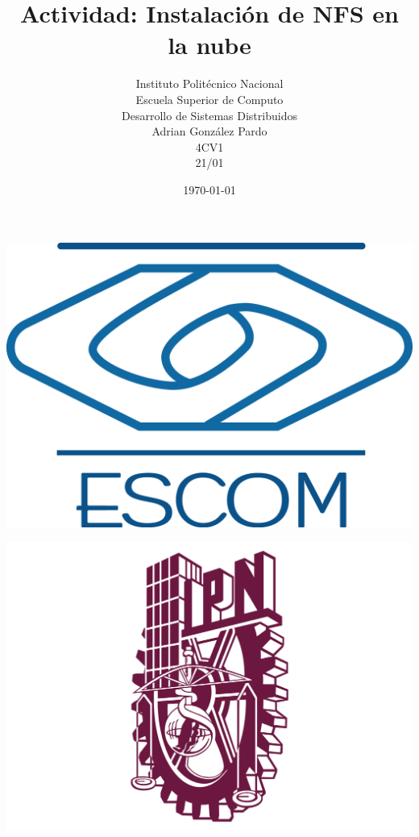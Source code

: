 \documentclass[10pt,executivepaper]{article}
\title{Actividad: Instalación de NFS en la nube}
\author{Instituto Politécnico Nacional\\Escuela Superior de Computo\\Desarrollo de Sistemas Distribuidos\\Adrian González Pardo\\4CV1\\21/01}
\date{\today}
\begin{document}
\begin{minipage}{0.4\textwidth}
	\begin{flushleft}
		\includegraphics[scale = 0.05]{logoescom.png}
	\end{flushleft}
\end{minipage}
\begin{minipage}{0.51\textwidth}
	\begin{flushright}
		\includegraphics[scale = 0.055]{logoipn.png}
	\end{flushright}
\end{minipage}
\end{document}

